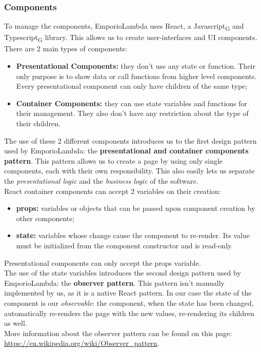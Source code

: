 \subsubsection{Components}
To manage the components, EmporioLambda uses React, a Javascript\textsubscript{G} and Typescript\textsubscript{G} library. This allows us to create user-interfaces and UI components.
There are 2 main types of components:
\begin{itemize}
\item \textbf{Presentational Components:} they don't use any state or function. Their only purpose is to show data or call functions from higher level components. Every presentational component can only have children of the same type;
\item \textbf{Container Components:} they can use state variables and functions for their management. They also don't have any restriction about the type of their children.
\end{itemize}
The use of these 2 different components introduces us to the first design pattern used by EmporioLambda: the \textbf{presentational and container components pattern}. This pattern allows us to create a page by using only single components, each with their own responsibility. This also easily lets us separate the \textit{presentational logic} and the \textit{business logic} of the software.\\
React container components can accept 2 variables on their creation:
\begin{itemize}
\item \textbf{props:} variables or objects that can be passed upon component creation by other components;
\item \textbf{state:} variables whose change cause the component to re-render. Its value must be initialized from the component constructor and is read-only.
\end{itemize}
Presentational components can only accept the props variable.\\
The use of the state variables introduces the second design pattern used by EmporioLambda: the \textbf{observer pattern}. This pattern isn't manually implemented by us, as it is a native React pattern. In our case the state of the component is our \textit{observable}: the component, when the state has been changed, automatically re-renders the page with the new values, re-rendering its children as well.\\More information about the observer pattern can be found on this page:\\
\url{https://en.wikipedia.org/wiki/Observer_pattern}.\\

